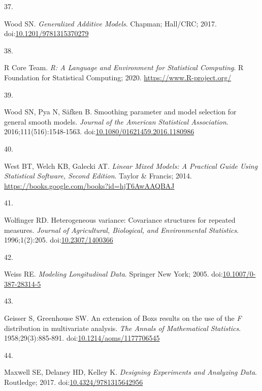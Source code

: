 \documentclass[
]{article}
\newlength{\cslhangindent}
\newlength{\csllabelwidth}
\newlength{\cslentryspacingunit} %
\newenvironment{CSLReferences}[2] %
 {%
  \setlength{\parindent}{0pt}
  \ifodd #1
  \let\oldpar\par
  \def\par{\hangindent=\cslhangindent\oldpar}
  \fi
  \setlength{\parskip}{#2\cslentryspacingunit}
 }%
 {}
\newcommand{\CSLLeftMargin}[1]{\parbox[t]{\csllabelwidth}{#1}}
\newcommand{\CSLRightInline}[1]{\parbox[t]{\linewidth - \csllabelwidth}{#1}\break}
\begin{document}
\begin{CSLReferences}{0}{0}
\leavevmode{}%
\CSLLeftMargin{37. }
\CSLRightInline{Wood SN. \emph{Generalized Additive Models}. Chapman; Hall/{CRC}; 2017. doi:\href{https://doi.org/10.1201/9781315370279}{10.1201/9781315370279}}

\leavevmode{}%
\CSLLeftMargin{38. }
\CSLRightInline{R Core Team. \emph{R: A Language and Environment for Statistical Computing}. R Foundation for Statistical Computing; 2020. \url{https://www.R-project.org/}}

\leavevmode{}%
\CSLLeftMargin{39. }
\CSLRightInline{Wood SN, Pya N, Säfken B. Smoothing parameter and model selection for general smooth models. \emph{Journal of the American Statistical Association}. 2016;111(516):1548-1563. doi:\href{https://doi.org/10.1080/01621459.2016.1180986}{10.1080/01621459.2016.1180986}}

\leavevmode{}%
\CSLLeftMargin{40. }
\CSLRightInline{West BT, Welch KB, Galecki AT. \emph{Linear Mixed Models: A Practical Guide Using Statistical Software, Second Edition}. Taylor \& Francis; 2014. \url{https://books.google.com/books?id=hjT6AwAAQBAJ}}

\leavevmode{}%
\CSLLeftMargin{41. }
\CSLRightInline{Wolfinger RD. Heterogeneous variance: Covariance structures for repeated measures. \emph{Journal of Agricultural, Biological, and Environmental Statistics}. 1996;1(2):205. doi:\href{https://doi.org/10.2307/1400366}{10.2307/1400366}}

\leavevmode{}%
\CSLLeftMargin{42. }
\CSLRightInline{Weiss RE. \emph{Modeling Longitudinal Data}. Springer New York; 2005. doi:\href{https://doi.org/10.1007/0-387-28314-5}{10.1007/0-387-28314-5}}

\leavevmode{}%
\CSLLeftMargin{43. }
\CSLRightInline{Geisser S, Greenhouse SW. An extension of {B}ox{\textquotesingle}s results on the use of the {\emph{F}} distribution in multivariate analysis. \emph{The Annals of Mathematical Statistics}. 1958;29(3):885-891. doi:\href{https://doi.org/10.1214/aoms/1177706545}{10.1214/aoms/1177706545}}

\leavevmode{}%
\CSLLeftMargin{44. }
\CSLRightInline{Maxwell SE, Delaney HD, Kelley K. \emph{Designing Experiments and Analyzing Data}. Routledge; 2017. doi:\href{https://doi.org/10.4324/9781315642956}{10.4324/9781315642956}}


\end{CSLReferences}
\end{document}

